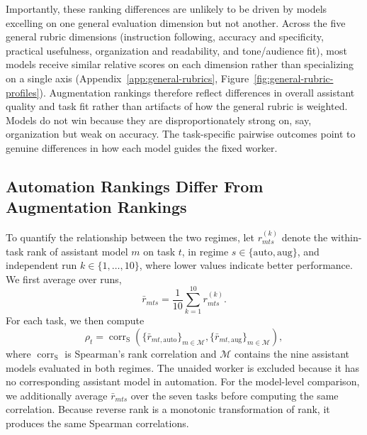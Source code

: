 Importantly, these ranking differences are unlikely to be driven by models excelling on one general evaluation dimension but not another. Across the five general rubric dimensions (instruction following, accuracy and specificity, practical usefulness, organization and readability, and tone/audience fit), most models receive similar relative scores on each dimension rather than specializing on a single axis (Appendix~\ref{app:general-rubrics}, Figure~\ref{fig:general-rubric-profiles}). Augmentation rankings therefore reflect differences in overall assistant quality and task fit rather than artifacts of how the general rubric is weighted. Models do not win because they are disproportionately strong on, say, organization but weak on accuracy. The task-specific pairwise outcomes point to genuine differences in how each model guides the fixed worker.

\subsection{Automation Rankings Differ From Augmentation Rankings}
\label{sec:role-swap}

To quantify the relationship between the two regimes, let
$r^{(k)}_{mts}$ denote the within-task rank of assistant model $m$ on task
$t$, in regime $s\in\{\mathrm{auto},\mathrm{aug}\}$, and independent run
$k\in\{1,\ldots,10\}$, where lower values indicate better performance. We
first average over runs,
\begin{equation}
    \bar r_{mts}=\frac{1}{10}\sum_{k=1}^{10}r^{(k)}_{mts}.
\end{equation}
For each task, we then compute
\begin{equation}
    \rho_t=\operatorname{corr}_{\mathrm{S}}
    \!\left(
      \{\bar r_{mt,\mathrm{auto}}\}_{m\in\mathcal{M}},
      \{\bar r_{mt,\mathrm{aug}}\}_{m\in\mathcal{M}}
    \right),
    \label{eq:task-mode-correlation}
\end{equation}
where $\operatorname{corr}_{\mathrm{S}}$ is Spearman's rank correlation and
$\mathcal{M}$ contains the nine assistant models evaluated in both regimes.
The unaided worker is excluded because it has no corresponding assistant model
in automation. For the model-level comparison, we additionally average
$\bar r_{mts}$ over the seven tasks before computing the same correlation.
Because reverse rank is a monotonic transformation of rank, it produces the
same Spearman correlations.

